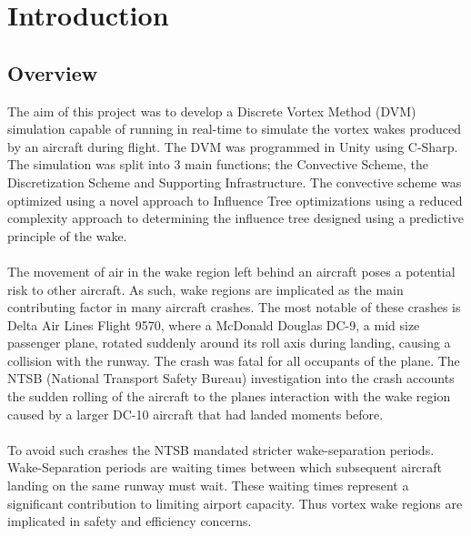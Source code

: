 \section{Introduction}
\subsection{Overview}
The aim of this project was to develop a Discrete Vortex Method (DVM) simulation capable of running in real-time to simulate the vortex wakes produced by an aircraft during flight. The DVM was programmed in Unity using C-Sharp. The simulation was split into 3 main functions; the Convective Scheme, the Discretization Scheme and Supporting Infrastructure. The convective scheme was optimized using a novel approach to Influence Tree optimizations using a reduced complexity approach to determining the influence tree  designed using a predictive principle of the wake.
\\\\
The movement of air in the wake region left behind an aircraft poses a potential risk to other aircraft. As such, wake regions are implicated as the main contributing factor in many aircraft crashes. The most notable of these crashes is Delta Air Lines Flight 9570, where a McDonald Douglas DC-9, a mid size passenger plane, rotated suddenly around its roll axis during landing, causing a collision with the runway. The crash was fatal for all occupants of the plane. The NTSB (National Transport Safety Bureau) investigation into the crash accounts the sudden rolling of the aircraft to the planes interaction with the wake region caused by a larger DC-10 aircraft that had landed moments before.
\\\\
To avoid such crashes the NTSB mandated stricter wake-separation periods. Wake-Separation periods are waiting times between which subsequent aircraft landing on the same runway must wait. These waiting times represent a significant contribution to limiting airport capacity. Thus vortex wake regions are implicated in safety and efficiency concerns.

